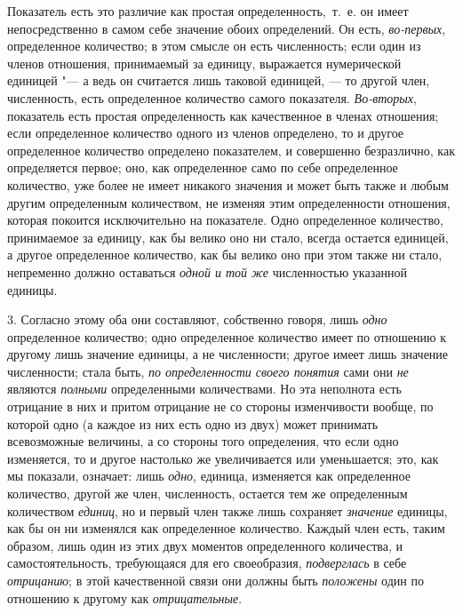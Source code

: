 Показатель есть это различие как простая определенность,~т.~е. он имеет
непосредственно в самом себе значение обоих определений. Он есть,
{\em во-первых}, определенное количество; в этом смысле
он есть численность; если один из членов отношения, принимаемый за единицу,
выражается нумерической единицей "--- а ведь он считается лишь таковой
единицей, — то другой член, численность, есть определенное количество
самого показателя. {\em Во-вторых}, показатель есть
простая определенность как качественное в членах отношения; если
определенное количество одного из членов определено, то и другое
определенное количество определено показателем, и совершенно безразлично,
как определяется первое; оно, как определенное само по себе определенное
количество, уже более не имеет никакого значения и может быть также и любым
другим определенным количеством, не изменяя этим определенности отношения,
которая покоится исключительно на показателе. Одно определенное количество,
принимаемое за единицу, как бы велико оно ни стало, всегда остается
единицей, а другое определенное количество, как бы велико оно при этом
также ни стало, непременно должно оставаться {\em одной
и той же} численностью указанной единицы.

3. Согласно этому оба они составляют, собственно говоря, лишь
{\em одно} определенное количество; одно определенное
количество имеет по отношению к другому лишь значение единицы, а не
численности; другое имеет лишь значение численности; стала быть,
{\em по определенности своего понятия} сами они
{\em не} являются {\em полными}
определенными количествами. Но эта неполнота есть отрицание в них и притом
отрицание не со стороны изменчивости вообще, по которой одно (а каждое из
них есть одно из двух) может принимать всевозможные величины, а со стороны
того определения, что если одно изменяется, то и другое настолько же
увеличивается или уменьшается; это, как мы показали, означает: лишь
{\em одно}, единица, изменяется как определенное
количество, другой же член, численность, остается тем же определенным
количеством {\em единиц}, но и первый член также лишь
сохраняет {\em значение} единицы, как бы он ни
изменялся как определенное количество. Каждый член есть, таким образом,
лишь один из этих двух моментов определенного количества, и
самостоятельность, требующаяся для его своеобразия,
{\em подверглась} в себе
{\em отрицанию}; в этой качественной связи они должны
быть {\em положены} один по отношению к другому как
{\em отрицательные}.

